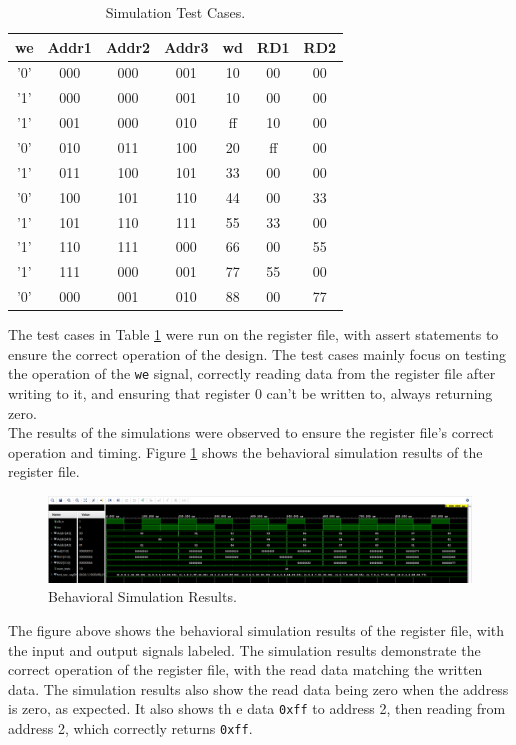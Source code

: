 \documentclass[CMPE]{../KGCOEReport}
\begin{document}
\begin{table}[h]
\centering
\begin{tabular}{|c|c|c|c|c|c|c|}
\hline
we & Addr1 & Addr2 & Addr3 & wd & RD1 & RD2 \\
\hline
'0' & 000 & 000 & 001 & 10 & 00 & 00 \\
'1' & 000 & 000 & 001 & 10 & 00 & 00 \\
'1' & 001 & 000 & 010 & ff & 10 & 00 \\
'0' & 010 & 011 & 100 & 20 & ff & 00 \\
'1' & 011 & 100 & 101 & 33 & 00 & 00 \\
'0' & 100 & 101 & 110 & 44 & 00 & 33 \\
'1' & 101 & 110 & 111 & 55 & 33 & 00 \\
'1' & 110 & 111 & 000 & 66 & 00 & 55 \\
'1' & 111 & 000 & 001 & 77 & 55 & 00 \\
'0' & 000 & 001 & 010 & 88 & 00 & 77 \\
\hline
\end{tabular}
\caption{Simulation Test Cases.}
\label{tab:test_cases}
\end{table}

The test cases in Table \ref{tab:test_cases} were run on the register file, with assert statements to ensure the correct operation of the design. The test cases mainly focus on testing the operation of the \verb|we| signal, correctly reading data from the register file after writing to it, and ensuring that register 0 can't be written to, always returning zero.\\

The results of the simulations were observed to ensure the register file's correct operation and timing. Figure \ref{fig:behavior} shows the behavioral simulation results of the register file.

\begin{figure}[H]
    \centering
    \includegraphics[width=1\textwidth]{behavior.png}
    \caption{Behavioral Simulation Results.}
    \label{fig:behavior}
\end{figure}

The figure above shows the behavioral simulation results of the register file, with the input and output signals labeled. The simulation results demonstrate the correct operation of the register file, with the read data matching the written data. The simulation results also show the read data being zero when the address is zero, as expected. It also shows th e data \verb|0xff| to address 2, then reading from address 2, which correctly returns \verb|0xff|.\\
\end{document}
